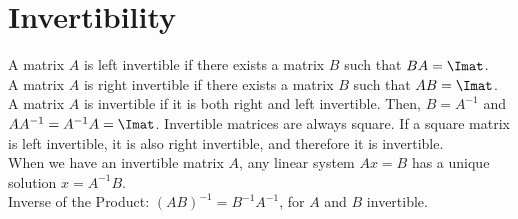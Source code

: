 \section*{Invertibility}

A matrix $A$ is left invertible if there exists a matrix $B$ such that $BA=\Imat$.\\

A matrix $A$ is right invertible if there exists a matrix $B$ such that $AB=\Imat$.\\

A matrix $A$ is invertible if it is both right and left invertible. Then, $B=A^{-1}$ and  $AA^{-1}=A^{-1}A=\Imat$. Invertible matrices are always square. If a square matrix is left invertible, it is also right invertible, and therefore it is invertible.\\

When we have an invertible matrix $A$, any linear system $Ax=B$ has a unique solution $x=A^{-1}B$.\\

Inverse of the Product: $(AB)^{-1}=B^{-1}A^{-1}$, for $A$ and $B$ invertible.